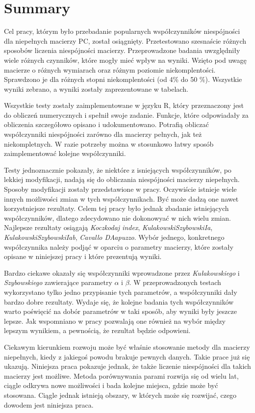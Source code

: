 \chapter{Summary}
\label{sec:summary}

Cel pracy, którym było przebadanie popularnych współczynników niespójności dla niepełnych macierzy PC, został osiągnięty. Przetestowano szesnaście różnych sposobów liczenia niespójności macierzy. Przeprowadzone badania uwzględniły wiele różnych czynników, które mogły mieć wpływ na wyniki. Wzięto pod uwagę macierze o różnych wymiarach oraz różnym poziomie niekomplentości. Sprawdzono je dla różnych stopni niekomplentości (od 4\% do 50 \%). Wszystkie wyniki zebrano, a wyniki zostały zaprezentowane w tabelach.

Wszystkie testy zostały zaimplementowane w języku R, który przeznaczony jest do obliczeń numerycznych i spełnił swoje zadanie. Funkcje, które odpowiadały za obliczenia szczegółowo opisano i udokumentowano. Potrafią obliczać współczynniki niespójności zarówno dla macierzy pełnych, jak też niekompletnych. W razie potrzeby można w stosunkowo łatwy sposób zaimplementować kolejne współczynniki.

Testy jednoznacznie pokazały, że niektóre z isniejących współczynników, po lekkiej modyfikacji, nadają się do obliczania niespójności macierzy niepełnych. Sposoby modyfikacji zostały przedstawione w pracy. Oczywiście istnieje wiele innych możliwości zmian w tych współczynnikach. Być może dadzą one nawet korzystniejsze rezultaty. Celem tej pracy było jednak zbadanie istniejących współczynników, dlatego zdecydowano nie dokonowyać w nich wielu zmian. Najlepsze rezultaty osiągają \textit{Koczkodaj index}, \textit{KulakowskiSzybowskiIa}, \textit{KulakowskiSzybowskiIab}, \textit{Cavallo DAapuzzo}. Wybór jednego, konkretnego współczynnika należy podjąć w oparciu o parametry macierzy, które zostały opisane w niniejszej pracy i które prezentują wyniki.

Bardzo ciekawe okazały się współczynniki wprowadzone przez \textit{Kułakowskiego} i \textit{Szybowskiego} zawierające parametry $\alpha$ i $\beta$. W przeprowadzonych testach wykorzystano tylko jedno przypisanie tych parametrów, a współczynniki dały bardzo dobre rezultaty. Wydaje się, że kolejne badania tych współczynników warto poświęcić na dobór parametrów w taki sposób, aby wyniki były jeszcze lepsze. Jak wspomniano w pracy pozwalają one również na wybór między lepszym wynikiem, a pewnością, że rezultat będzie odpowieni.

Ciekawym kierunkiem rozwoju może być właśnie stosowanie metody dla macierzy niepełnych, kiedy z jakiegoś powodu brakuje pewnych danych. Takie prace już się ukazują. Niniejsza praca pokazuje jednak, że także liczenie niespójności dla takich macierzy jest możliwe. Metoda porównywania parami rozwija się od wielu lat, ciągle odkrywa nowe możliwości i bada kolejne miejsca, gdzie może być stosowana. Ciągle jednak istnieją obszary, w których może się rozwijać, czego dowodem jest niniejsza praca.